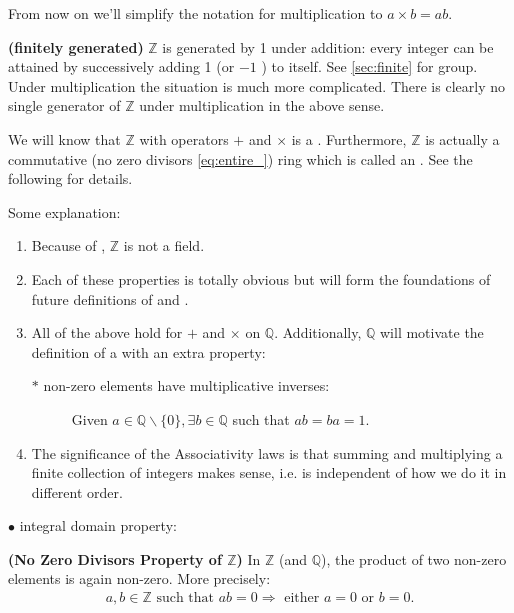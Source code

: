 \documentclass{article}
\newcommand{\bfs}[1]{\textbf{({#1}) }}
\begin{document}
From now on we'll simplify the notation for multiplication to $a \times b=a b$.
\begin{rema}{\bfs{finitely generated}}
$\mathbb{Z}$ is generated by 1 under addition: every integer can be attained by successively adding 1 (or $-1$ ) to itself. See \cref{sec:finite} for  group. Under multiplication the situation is much more complicated. There is clearly no single generator of $\mathbb{Z}$ under multiplication in the above sense.
\end{rema}
\begin{rema}
We will know that  $\mathbb{Z}$ with operators $+$ and $\times$ is a .  Furthermore, $\mathbb{Z}$  is actually a commutative  (no zero divisors \cref{eq:entire_}) ring which is called an . See the following for details.
\end{rema}
\begin{rema}Some explanation:

\begin{enumerate}
\item Because of , $\mathbb{Z}$ is not a field.
    \item Each of these properties is totally obvious but will form the foundations of future definitions of  and .
    \item All of the above hold for $+$ and $\times$ on $\mathbb{Q}$. Additionally, $\mathbb{Q}$ will motivate the definition of a  with an extra property:
    \begin{description}
  \item[$\ast$ non-zero elements have multiplicative inverses:] Given $a \in \mathbb{Q} \backslash\{0\}, \exists b \in \mathbb{Q}$ such that $a b=b a=1$.
  \end{description}
  \item The significance of the Associativity laws is that summing and multiplying a finite collection of integers makes sense, i.e. is independent of how we do it in different order.
\end{enumerate}
\end{rema}
\begin{description}
  \item[$\bullet$ integral domain property:]
\end{description}
\begin{lema}{\bfs{No Zero Divisors Property of $\mathbb{Z}$}}
In $\mathbb{Z}$ (and $\mathbb{Q}$), the product of two non-zero elements is again non-zero. More precisely: 
\begin{align*}
    a, b \in \mathbb{Z} \text{ such that } a b=0 \Rightarrow \text{ either } a=0\text{ or }b=0. \label{eq:entire_}
\end{align*}
\end{lema}
\end{document}
